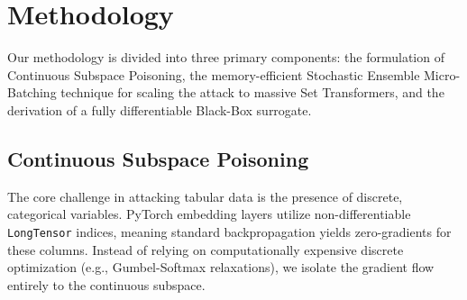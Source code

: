 \section{Methodology}
Our methodology is divided into three primary components: the formulation of Continuous Subspace Poisoning, the memory-efficient Stochastic Ensemble Micro-Batching technique for scaling the attack to massive Set Transformers, and the derivation of a fully differentiable Black-Box surrogate.

\subsection{Continuous Subspace Poisoning}
The core challenge in attacking tabular data is the presence of discrete, categorical variables. PyTorch embedding layers utilize non-differentiable \texttt{LongTensor} indices, meaning standard backpropagation yields zero-gradients for these columns. Instead of relying on computationally expensive discrete optimization (e.g., Gumbel-Softmax relaxations), we isolate the gradient flow entirely to the continuous subspace.

